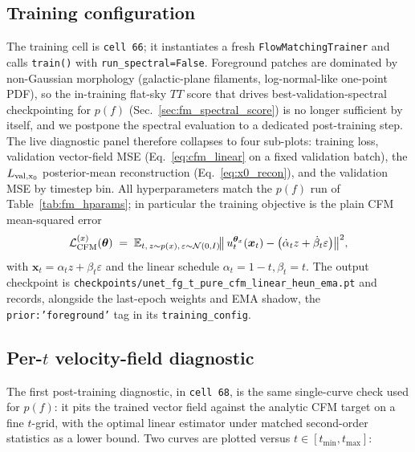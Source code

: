 \documentclass[11pt]{article}
\DeclareRobustCommand{\xvec}{\bm{x}}
\DeclareRobustCommand{\thetavec}{\bm{\theta}}
\theoremstyle{definition}
\begin{document}
\subsection{Training configuration}
\label{sec:fg_training_config}

The training cell is \texttt{cell~66}; it instantiates a fresh
\texttt{FlowMatchingTrainer} and calls \texttt{train()} with
\texttt{run\_spectral=False}. Foreground patches are dominated by
non-Gaussian morphology (galactic-plane filaments, log-normal-like
one-point PDF), so the in-training flat-sky $TT$ score that drives
best-validation-spectral checkpointing for $p(f)$
(Sec.~\ref{sec:fm_spectral_score}) is no longer sufficient by itself, and we
postpone the spectral evaluation to a dedicated post-training step. The
live diagnostic panel therefore collapses to four sub-plots: training
loss, validation vector-field MSE (Eq.~\ref{eq:cfm_linear} on a fixed
validation batch), the $L_{\rm val,x_0}$ posterior-mean reconstruction
(Eq.~\ref{eq:x0_recon}), and the validation MSE by timestep bin. All
hyperparameters match the $p(f)$ run of
Table~\ref{tab:fm_hparams}; in particular the training objective is the
plain CFM mean-squared error
\begin{equation}
  \mathcal L_{\rm CFM}^{(x)}(\thetavec)
  \;=\;
  \mathbb E_{t,\,z\sim p(x),\,\varepsilon\sim\mathcal N(0,I)}\!
  \bigl\|\,
    u_t^{\thetavec_x}(\xvec_t)
    -\bigl(\dot\alpha_t z + \dot\beta_t\varepsilon\bigr)
  \bigr\|^2,
\end{equation}
with $\xvec_t=\alpha_t z + \beta_t\varepsilon$ and the linear schedule
$\alpha_t=1-t,\beta_t=t$. The output checkpoint is
\texttt{checkpoints/unet\_fg\_t\_pure\_cfm\_linear\_heun\_ema.pt} and
records, alongside the last-epoch weights and EMA shadow, the
\texttt{prior:'foreground'} tag in its \texttt{training\_config}.

\subsection{Per-\texorpdfstring{$t$}{t} velocity-field diagnostic}
\label{sec:fg_pertdiag}

The first post-training diagnostic, in \texttt{cell~68}, is the same
single-curve check used for $p(f)$: it pits the trained vector field
against the analytic CFM target on a fine $t$-grid, with the optimal
linear estimator under matched second-order statistics as a lower bound.
Two curves are plotted versus $t\in[t_{\min},t_{\max}]$:
\end{document}
